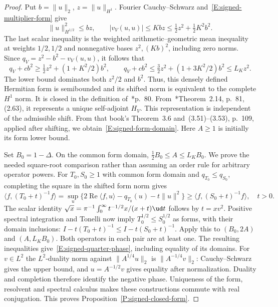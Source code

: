 \begin{proof}
  Put $b=\|u\|_2$, $z=\|u\|_{H^1}$.
  Fourier Cauchy--Schwarz and~\eqref{E:signed-multiplier-form} give
  \[
    \|u\|_{H^{1/2}}^2\le bz,\qquad
    |v_V(u,u)|\le Kbz\le\tfrac12z^2+\tfrac12K^2b^2 .
  \]
  The last scalar inequality is the weighted arithmetic--geometric
  mean inequality at weights $1/2,1/2$ and nonnegative bases
  $z^2,(Kb)^2$, including zero norms.
  Since $q_V=z^2-b^2-v_V(u,u)$, it follows that
  \[
    q_V+cb^2\ge\tfrac12z^2+(1+K^2/2)b^2,\qquad
    q_V+cb^2\le\tfrac32z^2+(1+3K^2/2)b^2\le L_Kz^2.
  \]
  The lower bound dominates both $z^2/2$ and $b^2$.
  Thus, this densely defined Hermitian form is semibounded
  and its shifted norm is equivalent to the complete $H^1$ norm.
  It is closed in the definition of~\cite{teschl:14:mathematical}*{p.~80}.
  From~\cite{teschl:14:mathematical}*{Theorem~2.14, p.~81, (2.63)},
  it represents a unique self-adjoint $H_V$.
  This representation is independent of the admissible shift.
  From that book's Theorem~3.6 and~(3.51)--(3.53), p.~109,
  applied after shifting, we obtain~\eqref{E:signed-form-domain}.
  Here $A\ge1$ is initially its form lower bound.

  Set $B_0=1-\Delta$. On the common form domain,
  $\tfrac12B_0\le A\le L_KB_0$.
  We prove the needed square-root comparison rather than assuming
  an order rule for arbitrary operator powers.
  For $T_0,S_0\ge1$ with common form domain and $q_{T_0}\le q_{S_0}$,
  completing the square in the shifted form norm gives
  \[
    \langle f,(T_0+t)^{-1}f\rangle
    =\sup_u\{2\operatorname{Re}\langle f,u\rangle
    -q_{T_0}(u)-t\|u\|^2\}
    \ge\langle f,(S_0+t)^{-1}f\rangle,\quad t>0 .
  \]
  The scalar identity
  $\sqrt x=\pi^{-1}\int_0^\infty t^{-1/2}x/(x+t)\ud t$
  follows by $t=xv^2$.
  Positive spectral integration and Tonelli now imply
  $T_0^{1/2}\le S_0^{1/2}$ as forms, with their domain inclusions:
  $I-t(T_0+t)^{-1}\le I-t(S_0+t)^{-1}$.
  Apply this to $(B_0,2A)$ and $(A,L_KB_0)$.
  Both operators in each pair are at least one.
  The resulting inequalities give~\eqref{E:signed-quarter-phase},
  including equality of its domains.
  For $v\in L^2$ the $L^2$-duality norm against
  $\|A^{1/4}u\|_2$ is $\|A^{-1/4}v\|_2$:
  Cauchy--Schwarz gives the upper bound, and $u=A^{-1/2}v$
  gives equality after normalization.
  Duality and completion therefore identify the negative phase.
  Uniqueness of the form, resolvent and spectral calculus makes
  these constructions commute with real conjugation.
  This proves Proposition~\ref{P:signed-closed-form}.
\end{proof}

